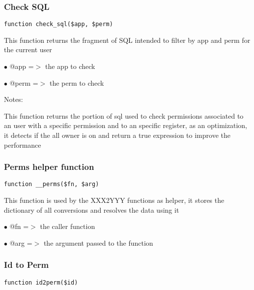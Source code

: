 \documentclass[a4paper]{article}
\begin{document}
\hypertarget{toc192}{}
\subsubsection{Check SQL}

\begin{lstlisting}
function check_sql($app, $perm)
\end{lstlisting}

This function returns the fragment of SQL intended to filter by app and
perm for the current user

\begin{compactitem}
\item[\color{myblue}$\bullet$] @app  =$>$ the app to check
\item[\color{myblue}$\bullet$] @perm =$>$ the perm to check
\end{compactitem}

Notes:

This function returns the portion of sql used to check permissions
associated to an user with a specific permission and to an specific
register, as an optimization, it detects if the all owner is on and
return a true expression to improve the performance

\hypertarget{toc193}{}
\subsubsection{Perms helper function}

\begin{lstlisting}
function __perms($fn, $arg)
\end{lstlisting}

This function is used by the XXX2YYY functions as helper, it stores the
dictionary of all conversions and resolves the data using it

\begin{compactitem}
\item[\color{myblue}$\bullet$] @fn  =$>$ the caller function
\item[\color{myblue}$\bullet$] @arg =$>$ the argument passed to the function
\end{compactitem}

\hypertarget{toc194}{}
\subsubsection{Id to Perm}

\begin{lstlisting}
function id2perm($id)
\end{lstlisting}
\end{document}
